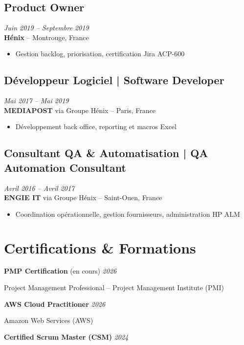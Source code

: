 \documentclass[11pt,a4paper]{article}
\begin{document}
\subsection*{Product Owner} \hfill \textit{Juin 2019 -- Septembre 2019}\\
\textbf{Hénix} -- Montrouge, France\\
\begin{itemize}
    \item Gestion backlog, priorisation, certification Jira ACP-600
\end{itemize}

\subsection*{Développeur Logiciel | Software Developer} \hfill \textit{Mai 2017 -- Mai 2019}\\
\textbf{MEDIAPOST} via Groupe Hénix -- Paris, France\\
\begin{itemize}
    \item Développement back office, reporting et macros Excel
\end{itemize}

\subsection*{Consultant QA \& Automatisation | QA Automation Consultant} \hfill \textit{Avril 2016 -- Avril 2017}\\
\textbf{ENGIE IT} via Groupe Hénix -- Saint-Ouen, France\\
\begin{itemize}
    \item Coordination opérationnelle, gestion fournisseurs, administration HP ALM
\end{itemize}

\section*{Certifications \& Formations}

\textbf{PMP Certification} (en cours) \hfill \textit{2026}

Project Management Professional -- Project Management Institute (PMI)

\textbf{AWS Cloud Practitioner} \hfill \textit{2026}

Amazon Web Services (AWS)

\textbf{Certified Scrum Master (CSM)} \hfill \textit{2024}
\end{document}
